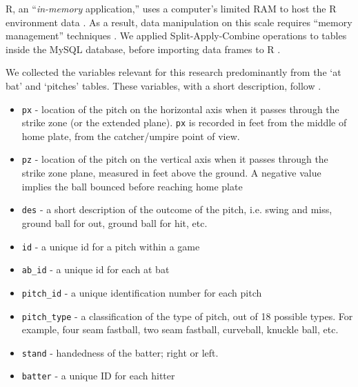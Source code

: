 R, an ``{\it in-memory} application,'' uses a computer's limited RAM to host the R environment data \citep{Smith2013}. As a result, data manipulation on this scale requires ``memory management'' techniques \citep{Wickham2014}.  We applied Split-Apply-Combine operations to tables inside the MySQL database, before importing data frames to R \citep{Wickham2011}.

We collected the variables relevant for this research predominantly from the `at bat' and `pitches' tables. These variables, with a short description, follow \citep{Fast2007}.
  \begin{itemize}
  \item \verb|px| - location of the pitch on the horizontal axis when it passes through the strike zone (or the extended plane). \verb|px| is recorded in feet from the middle of home plate, from the catcher/umpire point of view.
  \item \verb|pz| - location of the pitch on the vertical axis when it passes through the strike zone plane, measured in feet above the ground. A negative value implies the ball bounced before reaching home plate
  \item \verb|des| - a short description of the outcome of the pitch, i.e. swing and miss, ground ball for out, ground ball for hit, etc.  
  \item \verb|id| - a unique id for a pitch within a game
  \item \verb|ab_id| - a unique id for each at bat  
  \item \verb|pitch_id| - a unique identification number for each pitch
  \item \verb|pitch_type| - a classification of the type of pitch, out of 18 possible types. For example, four seam fastball, two seam fastball, curveball, knuckle ball, etc.
  \item \verb|stand| - handedness of the batter; right or left.
  \item \verb|batter| - a unique ID for each hitter
  \end{itemize}


